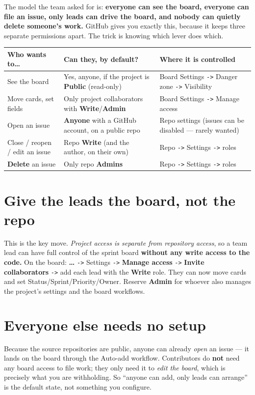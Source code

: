 \documentclass[11pt,a4paper]{report}
\newcommand{\code}[1]{\texttt{#1}}
\begin{document}
The model the team asked for is: \textbf{everyone can see the board, everyone can
file an issue, only leads can drive the board, and nobody can quietly delete
someone's work.} GitHub gives you exactly this, because it keeps three separate
permissions apart. The trick is knowing which lever does which.

\begin{center}
\begin{longtable}{@{}p{3.4cm}p{5.4cm}p{4.2cm}@{}}
\toprule
\textbf{Who wants to\ldots} & \textbf{Can they, by default?} & \textbf{Where it is controlled} \\
\midrule
\endhead
See the board & Yes, anyone, if the project is \textbf{Public} (read-only) & Board Settings \code{->} Danger zone \code{->} Visibility \\
\addlinespace
Move cards, set fields & Only project collaborators with \textbf{Write}/\textbf{Admin} & Board Settings \code{->} Manage access \\
\addlinespace
Open an issue & \textbf{Anyone} with a GitHub account, on a public repo & Repo settings (issues can be disabled --- rarely wanted) \\
\addlinespace
Close / reopen / edit an issue & Repo \textbf{Write} (and the author, on their own) & Repo \code{->} Settings \code{->} roles \\
\addlinespace
\textbf{Delete} an issue & Only repo \textbf{Admins} & Repo \code{->} Settings \code{->} roles \\
\bottomrule
\end{longtable}
\end{center}

\section{Give the leads the board, not the repo}
This is the key move. \emph{Project access is separate from repository access}, so
a team lead can have full control of the sprint board \textbf{without any write
access to the code.} On the board: \textbf{\ldots} \code{->} Settings \code{->}
\textbf{Manage access} \code{->} \textbf{Invite collaborators} \code{->} add each
lead with the \textbf{Write} role. They can now move cards and set
Status/Sprint/Priority/Owner. Reserve \textbf{Admin} for whoever also manages the
project's settings and the board workflows.

\section{Everyone else needs no setup}
Because the source repositories are public, anyone can already \emph{open} an
issue --- it lands on the board through the Auto-add workflow. Contributors do
\textbf{not} need any board access to file work; they only need it to \emph{edit
the board}, which is precisely what you are withholding. So ``anyone can add,
only leads can arrange'' is the default state, not something you configure.
\end{document}

